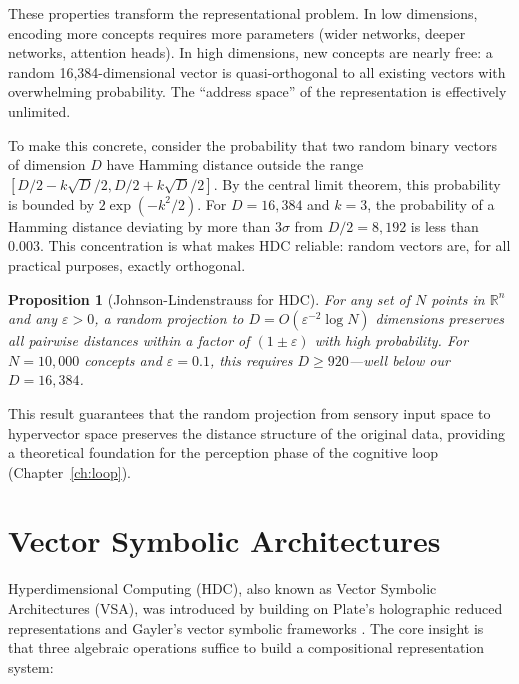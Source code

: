 \documentclass[12pt]{book}
\newtheorem{proposition}[theorem]{Proposition}
\newcommand{\R}{\mathbb{R}}
\begin{document}
These properties transform the representational problem. In low dimensions, encoding more concepts requires more parameters (wider networks, deeper networks, attention heads). In high dimensions, new concepts are nearly free: a random 16,384-dimensional vector is quasi-orthogonal to all existing vectors with overwhelming probability. The ``address space'' of the representation is effectively unlimited.

To make this concrete, consider the probability that two random binary vectors of dimension $D$ have Hamming distance outside the range $[D/2 - k\sqrt{D}/2, D/2 + k\sqrt{D}/2]$. By the central limit theorem, this probability is bounded by $2\exp(-k^2/2)$. For $D = 16{,}384$ and $k = 3$, the probability of a Hamming distance deviating by more than $3\sigma$ from $D/2 = 8{,}192$ is less than $0.003$. This concentration is what makes HDC reliable: random vectors are, for all practical purposes, exactly orthogonal.

\begin{proposition}[Johnson-Lindenstrauss for HDC]
For any set of $N$ points in $\R^n$ and any $\varepsilon > 0$, a random projection to $D = O(\varepsilon^{-2} \log N)$ dimensions preserves all pairwise distances within a factor of $(1 \pm \varepsilon)$ with high probability. For $N = 10{,}000$ concepts and $\varepsilon = 0.1$, this requires $D \geq 920$---well below our $D = 16{,}384$.
\end{proposition}

This result guarantees that the random projection from sensory input space to hypervector space preserves the distance structure of the original data, providing a theoretical foundation for the perception phase of the cognitive loop (Chapter~\ref{ch:loop}).

\section{Vector Symbolic Architectures}

Hyperdimensional Computing (HDC), also known as Vector Symbolic Architectures (VSA), was introduced by \citet{kanerva2009hyperdimensional} building on Plate's holographic reduced representations \citep{plate2003holographic} and Gayler's vector symbolic frameworks \citep{gayler2003vector}. The core insight is that three algebraic operations suffice to build a compositional representation system:
\end{document}
